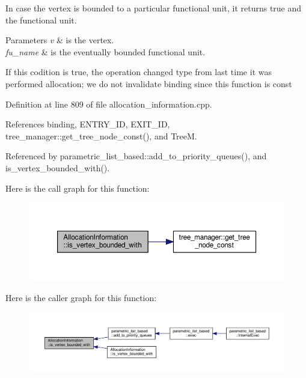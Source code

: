 In case the vertex is bounded to a particular functional unit, it returns true and the functional unit. 


\begin{DoxyParams}{Parameters}
{\em v} & is the vertex. \\
\hline
{\em fu\+\_\+name} & is the eventually bounded functional unit. \\
\hline
\end{DoxyParams}
If this codition is true, the operation changed type from last time it was performed allocation; we do not invalidate binding since this function is const 

Definition at line 809 of file allocation\+\_\+information.\+cpp.



References binding, E\+N\+T\+R\+Y\+\_\+\+ID, E\+X\+I\+T\+\_\+\+ID, tree\+\_\+manager\+::get\+\_\+tree\+\_\+node\+\_\+const(), and TreeM.



Referenced by parametric\+\_\+list\+\_\+based\+::add\+\_\+to\+\_\+priority\+\_\+queues(), and is\+\_\+vertex\+\_\+bounded\+\_\+with().

Here is the call graph for this function\+:
\nopagebreak
\begin{figure}[H]
\begin{center}
\leavevmode
\includegraphics[width=350pt]{d7/d79/classAllocationInformation_a37ec8afd2ce39886932cfbf4127cccad_cgraph}
\end{center}
\end{figure}
Here is the caller graph for this function\+:
\nopagebreak
\begin{figure}[H]
\begin{center}
\leavevmode
\includegraphics[width=350pt]{d7/d79/classAllocationInformation_a37ec8afd2ce39886932cfbf4127cccad_icgraph}
\end{center}
\end{figure}
\mbox{\label{classAllocationInformation_af51d3df93977eec2dcab91f789c08d38}} 
